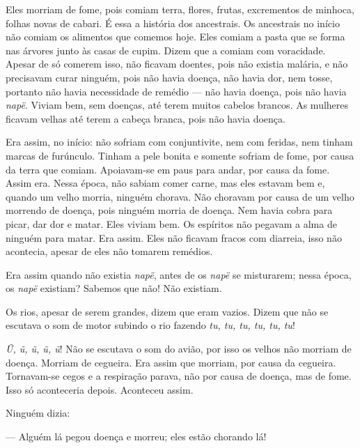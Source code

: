 Eles morriam de fome, pois comiam terra, flores, frutas,
 excrementos de minhoca, folhas novas de cabari. É essa a história dos
 ancestrais. Os ancestrais no início não comiam os alimentos que comemos
 hoje. Eles comiam a pasta que se forma nas árvores junto às casas de
 cupim. Dizem que a comiam com voracidade. Apesar de só comerem isso, não
 ficavam doentes, pois não existia malária, e não precisavam curar
 ninguém, pois não havia doença, não havia dor, nem tosse, portanto não
 havia necessidade de remédio --- não havia doença, pois não
 havia \textit{napë}. Viviam bem, sem doenças, até terem muitos cabelos
 brancos. As mulheres ficavam velhas até terem a cabeça branca, pois não
 havia doença. 

Era assim, no início: não sofriam com conjuntivite, nem com feridas, nem
tinham marcas de furúnculo. Tinham a pele bonita e somente sofriam de
fome, por causa da terra que comiam. Apoiavam-se em paus para andar, por
causa da fome. Assim era. Nessa época, não sabiam comer carne, mas eles
estavam bem e, quando um velho morria, ninguém chorava. Não choravam por
causa de um velho morrendo de doença, pois ninguém morria de doença. Nem
havia cobra para picar, dar dor e matar. Eles viviam bem. Os espíritos
não pegavam a alma de ninguém para matar. Era assim. Eles não ficavam
fracos com diarreia, isso não acontecia, apesar de eles não tomarem
remédios. 

Era assim quando não existia \textit{napë}, antes de os \textit{napë} se
misturarem; nessa época, os \textit{napë} existiam? Sabemos que não! Não
existiam. 

Os rios, apesar de serem grandes, dizem que eram vazios. Dizem que não
se escutava o som de motor subindo o rio fazendo \textit{tu, tu, tu, tu, tu,
tu}!

\textit{Ũ, ũ, ũ, ũ, ũ}! Não se escutava o som do avião, por isso os velhos
não morriam de doença. Morriam de cegueira. Era assim que morriam, por
causa da cegueira. Tornavam-se cegos e a respiração parava, não por
causa de doença, mas de fome. Isso só aconteceria depois. Aconteceu
assim. 

Ninguém dizia:

--- Alguém lá pegou doença e morreu; eles estão chorando lá! 


